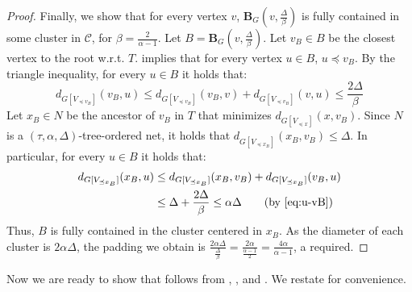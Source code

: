 \documentclass{theoretics}
\def\ball{\mathbf{B}}
\begin{document}
\begin{proof}
	Finally, we show that for every vertex $v$, $\ball_G(v,\frac\Delta\beta)$ is fully contained in some cluster in $\mathcal{C}$, for $\beta=\frac{2}{\alpha-1}$. Let $B=\ball_G(v,\frac{\Delta}{\beta})$.	Let $v_B\in B$ be the closest vertex to the root w.r.t. $T$.  implies that for every vertex $u\in B$,  $u\preceq v_B$. By the triangle inequality, for every $u\in B$ it holds that:
	\begin{equation}\label{eq:u-vB}
		d_{G[V_{\preceq v_B}]}(v_B,u)\le d_{G[V_{\preceq v_B}]}(v_B,v)+d_{G[V_{\preceq v_B}]}(v,u)\le\frac{2\Delta}{\beta}
	\end{equation}
	Let $x_B\in N$ be the ancestor of $v_B$ in $T$ that minimizes $d_{G[V_{\preceq x}]}(x,v_B)$. Since $N$ is a $(\tau,\alpha,\Delta)$-tree-ordered net, it holds that $d_{G[V_{\preceq x_B}]}(x_B,v_B)\le\Delta$. In particular, for every $u\in B$ it holds that:
	\begin{equation*}
		\begin{split}
			d_{G[V_{\preceq x_B}]}(x_B,u) &\le d_{G[V_{\preceq x_B}]}(x_B,v_B)+d_{G[V_{\preceq x_B}]}(v_B,u)\\
			&\le\Delta+\frac{2\Delta}{\beta}\le\alpha\Delta    \qquad \mbox{(by \cref{eq:u-vB})}         
		\end{split}
	\end{equation*}
	Thus, $B$ is fully contained in the cluster centered in $x_B$.
	As the diameter of each cluster is $2\alpha\Delta$, the padding we obtain is $\frac{2\alpha\Delta}{\frac{\Delta}{\beta}}=\frac{2\alpha}{\frac{\alpha-1}{2}}=\frac{4\alpha}{\alpha-1}$, 
	a required.
\end{proof}

Now we are ready to show that  follows from , , and . We restate  for convenience.
\end{document}
